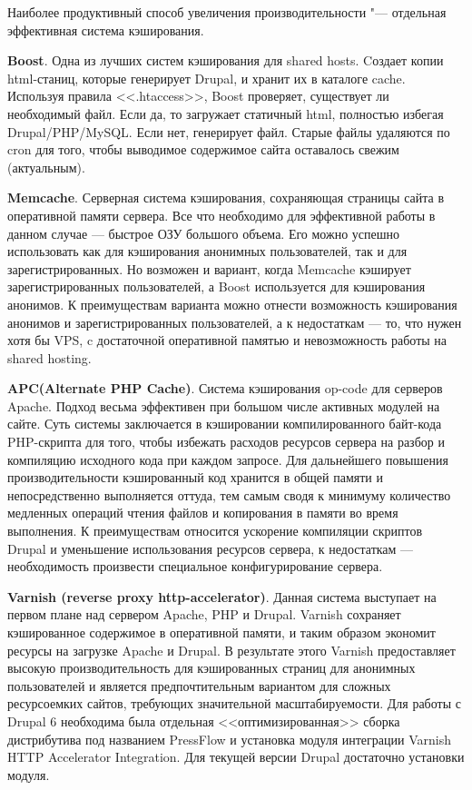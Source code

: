 \documentclass[10pt, a5paper]{article}
\begin{document}
Наиболее продуктивный способ увеличения производительности "--- отдельная эффективная система кэширования.

{\bf Boost}. Одна из лучших систем кэширования для shared hosts. Cоздает копии html-станиц, которые генерирует Drupal, и хранит их в каталоге cache. Используя правила <<.htaccess>>, Boost проверяет, существует ли необходимый файл. Если да, то загружает статичный html, полностью избегая Drupal/PHP/MySQL. Если нет,  генерирует файл. Старые файлы удаляются по cron для того, чтобы выводимое содержимое сайта оставалось свежим (актуальным).

{\bf Memcache}. Серверная система кэширования, сохраняющая \linebreak страницы сайта в оперативной памяти сервера. Все что необходимо для эффективной работы в данном случае --- быстрое ОЗУ большого объема. Его можно успешно использовать как для кэширования анонимных пользователей, так и для зарегистрированных. Но возможен и вариант, когда Memcache кэширует зарегистрированных пользователей, а Boost используется для кэширования анонимов. К преимуществам варианта можно отнести возможность кэширования анонимов и зарегистрированных пользователей, а к недостаткам --- то, что нужен хотя бы VPS, c достаточной оперативной памятью и невозможность работы на shared hosting.

{\bf APC(Alternate PHP Cache)}. Система кэширования op-code для серверов Apache. Подход весьма эффективен при большом числе активных модулей на сайте. Суть системы заключается в кэшировании компилированного байт-кода PHP-скрипта для того, чтобы избежать расходов ресурсов сервера на разбор и компиляцию исходного кода при каждом запросе. Для дальнейшего повышения производительности кэшированный код хранится в общей памяти и непосредственно выполняется оттуда, тем самым сводя к минимуму количество медленных операций чтения файлов и копирования в памяти во время выполнения.
К преимуществам относится ускорение компиляции скриптов Drupal и уменьшение использования ресурсов сервера, к недостаткам --- необходимость произвести специальное конфигурирование сервера.

{\bf Varnish (reverse proxy http-accelerator)}. Данная система выступает на первом плане над сервером Apache, PHP и Drupal. \linebreak Varnish сохраняет кэшированное содержимое в оперативной памяти, и таким образом экономит ресурсы на загрузке Apache и Drupal. В результате этого Varnish предоставляет высокую производительность для кэшированных страниц для анонимных пользователей и является предпочтительным вариантом для сложных ресурсоемких сайтов, требующих значительной  масштабируемости. Для работы с Drupal 6 необходима была отдельная <<оптимизированная>> сборка дистрибутива под названием PressFlow и установка модуля интеграции Varnish HTTP Accelerator Integration. Для текущей версии Drupal достаточно установки модуля.
\end{document}
